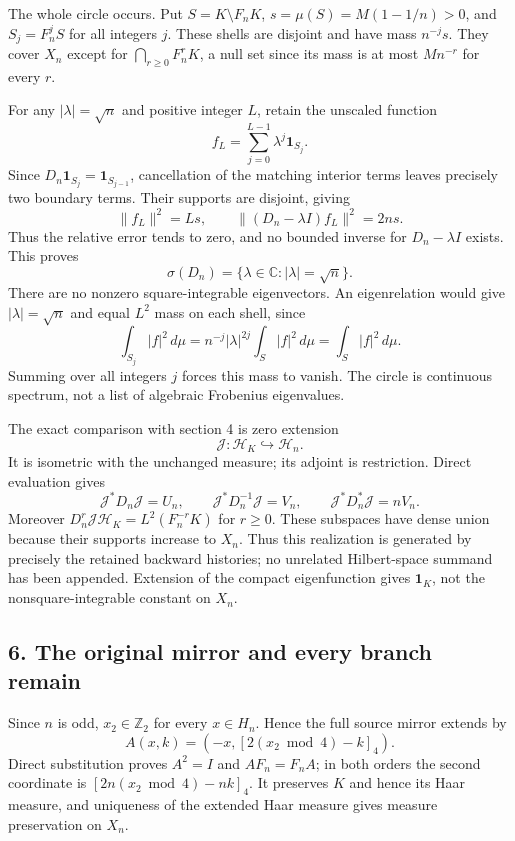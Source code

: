 \documentclass[
]{article}
\begin{document}
The whole circle occurs. Put \(S=K\setminus F_nK\),
\(s=\mu(S)=M(1-1/n)>0\), and \(S_j=F_n^jS\) for all integers \(j\).
These shells are disjoint and have mass \(n^{-j}s\). They cover \(X_n\)
except for \(\bigcap_{r\ge0}F_n^rK\), a null set since its mass is at
most \(Mn^{-r}\) for every \(r\).

For any \(|\lambda|=\sqrt n\) and positive integer \(L\), retain the
unscaled function \[
f_L=\sum_{j=0}^{L-1}\lambda^j\mathbf1_{S_j}.
\] Since \(D_n\mathbf1_{S_j}=\mathbf1_{S_{j-1}}\), cancellation of the
matching interior terms leaves precisely two boundary terms. Their
supports are disjoint, giving \[
\|f_L\|^2=Ls,\qquad
\|(D_n-\lambda I)f_L\|^2=2ns.
\] Thus the relative error tends to zero, and no bounded inverse for
\(D_n-\lambda I\) exists. This proves \[
\boxed{\sigma(D_n)=\{\lambda\in\mathbb C:|\lambda|=\sqrt n\}.}
\] There are no nonzero square-integrable eigenvectors. An eigenrelation
would give \(|\lambda|=\sqrt n\) and equal \(L^2\) mass on each shell,
since \[
\int_{S_j}|f|^2\,d\mu=n^{-j}|\lambda|^{2j}\int_S|f|^2\,d\mu
=\int_S|f|^2\,d\mu.
\] Summing over all integers \(j\) forces this mass to vanish. The
circle is continuous spectrum, not a list of algebraic Frobenius
eigenvalues.

The exact comparison with section 4 is zero extension \[
\mathcal J:\mathcal H_K\hookrightarrow\mathcal H_n.
\] It is isometric with the unchanged measure; its adjoint is
restriction. Direct evaluation gives \[
\mathcal J^*D_n\mathcal J=U_n,\qquad
\mathcal J^*D_n^{-1}\mathcal J=V_n,\qquad
\mathcal J^*D_n^*\mathcal J=nV_n.
\] Moreover \(D_n^r\mathcal J\mathcal H_K=L^2(F_n^{-r}K)\) for
\(r\ge0\). These subspaces have dense union because their supports
increase to \(X_n\). Thus this realization is generated by precisely the
retained backward histories; no unrelated Hilbert-space summand has been
appended. Extension of the compact eigenfunction gives \(\mathbf1_K\),
not the nonsquare-integrable constant on \(X_n\).

\subsection{6. The original mirror and every branch
remain}\label{the-original-mirror-and-every-branch-remain}

Since \(n\) is odd, \(x_2\in\mathbb Z_2\) for every \(x\in H_n\). Hence
the full source mirror extends by \[
A(x,k)=(-x,[2(x_2\bmod4)-k]_4).
\] Direct substitution proves \(A^2=I\) and \(AF_n=F_nA\); in both
orders the second coordinate is \([2n(x_2\bmod4)-nk]_4\). It preserves
\(K\) and hence its Haar measure, and uniqueness of the extended Haar
measure gives measure preservation on \(X_n\).
\end{document}
